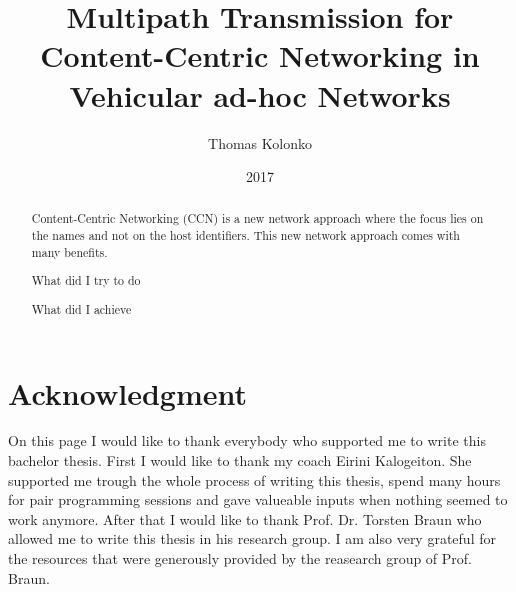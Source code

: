 \documentclass[11pt,a4paper,twoside,]{rvsbachelor}
\author{Thomas Kolonko}
\title{Multipath Transmission for Content-Centric Networking in Vehicular ad-hoc Networks}
\date{2017}
\makeatletter
\def\cleardoublepage{\clearpage\if@twoside \ifodd\c@page\else
	\hbox{}
	\thispagestyle{empty}
	\newpage
\fi\fi}
\makeatother
\begin{document}
\maketitle
\thispagestyle{empty}
\mbox{}

\newpage
{}
\tableofcontents{}
\listoffigures{}
\listoftables{}



\chapter*{Acknowledgment}
On this page I would like to thank everybody who supported me to write this bachelor thesis.
First I would like to thank my coach Eirini Kalogeiton. She supported me trough the whole process of writing this thesis, spend many hours for pair programming sessions and gave valueable inputs when nothing seemed to work anymore.
After that I would like to thank Prof. Dr. Torsten Braun who allowed me to write this thesis in his research group. I am also very grateful for the resources that were generously provided by the reasearch group of Prof. Braun.

\begin{abstract}
Content-Centric Networking (CCN) is a new network approach where the focus lies on the names and not on the host identifiers. This new network approach comes with many benefits.

What did I try to do

What did I achieve
\end{abstract}

\cleardoublepage
\setcounter{page}{1}	%













\end{document}

